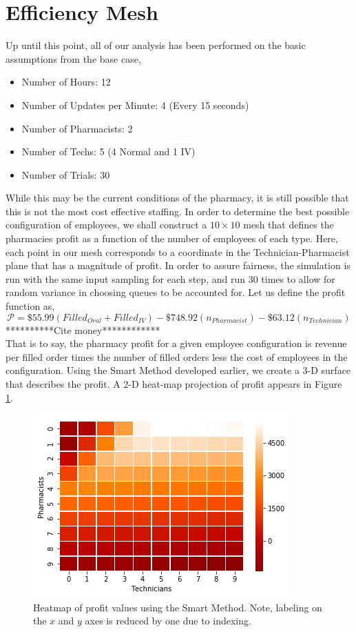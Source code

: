 \documentclass[10pt]{report}            %
\begin{document}
\section*{Efficiency Mesh}
Up until this point, all of our analysis has been performed on the basic assumptions from the base case,
\begin{itemize}
\item Number of Hours: 12
\item Number of Updates per Minute: 4 (Every 15 seconds)
\item Number of Pharmacists: 2
\item Number of Techs: 5 (4 Normal and 1 IV)
\item Number of Trials: 30
\end{itemize}
While this may be the current conditions of the pharmacy, it is still possible that this is not the most cost effective staffing. In order to determine the best possible configuration of employees, we shall construct a $10\times 10$ mesh that defines the pharmacies profit as a function of the number of employees of each type. Here, each point in our mesh corresponds to a coordinate in the Technician-Pharmacist plane that has a magnitude of profit. In order to assure fairness, the simulation is run with the same input sampling for each step, and run 30 times to allow for random variance in choosing queues to be accounted for. Let us define the profit function as,
\[\mathcal{P}=\$55.99(Filled_{Oral}+Filled_{IV})-\$748.92(n_{Pharmacist})-\$63.12(n_{Technician})\] **********Cite money************\\
That is to say, the pharmacy profit for a given employee configuration is revenue per filled order times the number of filled orders less the cost of employees in the configuration. Using the Smart Method developed earlier, we create a 3-D surface that describes the profit. A 2-D heat-map projection of profit appears in Figure \ref{fig:heatmap}.
\begin{figure}[h]
\centering
\includegraphics[scale=.75]{profitheatmap.png}
\caption{Heatmap of profit values using the Smart Method. Note, labeling on the $x$ and $y$ axes is reduced by one due to indexing.}
\label{fig:heatmap}
\end{figure}
\end{document}
